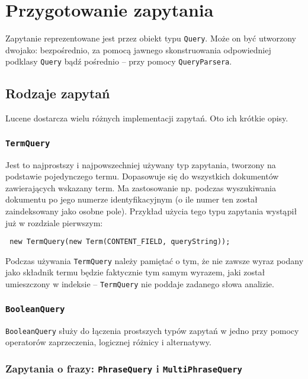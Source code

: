 \section{Przygotowanie zapytania}

Zapytanie reprezentowane jest przez obiekt typu \texttt{Query}. Może on być utworzony dwojako: bezpośrednio, za pomocą jawnego skonstruowania odpowiedniej podklasy \texttt{Query} bądź pośrednio -- przy pomocy \texttt{QueryParsera}.

\subsection{Rodzaje zapytań}

Lucene dostarcza wielu różnych implementacji zapytań. Oto ich krótkie opisy.

\subsubsection{\texttt{TermQuery}}

Jest to najprostszy i najpowszechniej używany typ zapytania, tworzony na podstawie pojedynczego termu. Dopasowuje się do wszystkich dokumentów zawierających wskazany term. Ma zastosowanie np. podczas wyszukiwania dokumentu po jego numerze identyfikacyjnym (o ile numer ten został zaindeksowany jako osobne pole). Przykład użycia tego typu zapytania wystąpił już w rozdziale pierwszym:

\begin{lstlisting}
 new TermQuery(new Term(CONTENT_FIELD, queryString));
\end{lstlisting}

Podczas używania \texttt{TermQuery} należy pamiętać o tym, że nie zawsze wyraz podany jako składnik termu będzie faktycznie tym samym wyrazem, jaki został umieszczony w indeksie -- \texttt{TermQuery} nie poddaje zadanego słowa analizie.

\subsubsection{\texttt{BooleanQuery}}

\texttt{BooleanQuery} służy do łączenia prostszych typów zapytań w jedno przy pomocy operatorów zaprzeczenia, logicznej różnicy i alternatywy. 

\subsubsection{Zapytania o frazy: \texttt{PhraseQuery} i \texttt{MultiPhraseQuery}}


